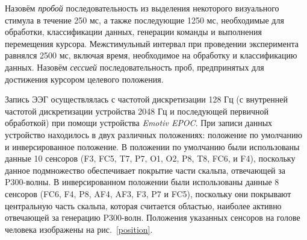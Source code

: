 \documentclass[12pt,fleqn]{article}
\begin{document}
	\par Назовём {\it пробой} последовательность из выделения некоторого визуального стимула в течение 250 мс, а также последующие 1250 мс, необходимые для обработки, классификации данных, генерации команды и выполнения перемещения курсора. Межстимульный интервал при проведении эксперимента равнялся 2500 мс, включая время, необходимое на обработку и классификацию данных. Назовём {\it сессией} последовательность проб, предпринятых для достижения курсором целевого положения.
	\par Запись ЭЭГ осуществлялась с частотой дискретизации 128 Гц (с внутренней частотой дискретизации устройства 2048 Гц и последующей первичной обработкой) при помощи устройства {\it Emotiv EPOC}. При записи данных устройство находилось в двух различных положениях: положение по умолчанию и инверсированное положение. В положении по умолчанию были использованы данные 10 сенсоров (F3, FC5, T7, P7, O1, O2, P8, T8, FC6, и F4), поскольку данное подмножество обеспечивает покрытие части скальпа, отвечающей за P300-волны. В инверсированном положении были использованы данные 8 сенсоров (FC6, F4, P8, AF4, AF3, F3, P7 и FC5), поскольку они покрывают центральную часть скальпа, которая считается областью, наиболее активно отвечающей за генерацию P300-волн. Положения указанных сенсоров на голове человека изображены на рис.~\ref{position}.
\end{document}
